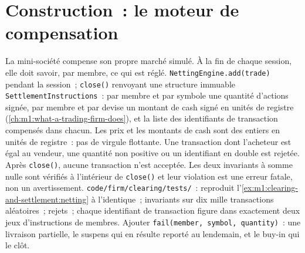 \begin{omfigure}

\end{omfigure}

\section{Construction~: le moteur de compensation}\label{bld:m1:clearing-and-settlement:netting}

\begin{build}
 La mini-société compense son propre marché simulé. À la
fin de chaque session, elle doit savoir, par membre, ce qui est réglé.
 \texttt{NettingEngine.add(trade)} pendant la session~;
\texttt{close()} renvoyant une structure immuable \texttt{SettlementInstructions}~:
par membre et par symbole une quantité d'actions signée, par membre et par devise un
montant de cash signé en unités de registre (\cref{ch:m1:what-a-trading-firm-does}),
et la liste des identifiants de transaction compensés dans chacun.
 Les prix et les montants de cash sont des entiers en unités de registre~: pas de virgule
flottante. Une transaction dont l'acheteur est égal au vendeur, une quantité non positive ou un
identifiant en double est rejetée. Après \texttt{close()}, aucune transaction n'est
acceptée. Les deux invariants à somme nulle sont vérifiés à l'intérieur de \texttt{close()}
et leur violation est une erreur fatale, non un avertissement.
 \texttt{code/firm/clearing/tests/}~: reproduit
l'\cref{ex:m1:clearing-and-settlement:netting} à l'identique~; invariants sur dix
mille transactions aléatoires~; rejets~; chaque identifiant de transaction figure dans exactement
deux jeux d'instructions de membres.
 Ajouter \texttt{fail(member, symbol, quantity)}~: une livraison partielle,
le suspens qui en résulte reporté au lendemain, et le buy-in qui
le clôt.
\end{build}

